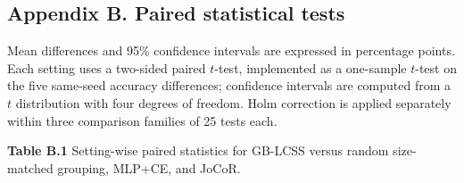\subsection{Appendix B. Paired statistical tests}\label{appendix-b.-paired-statistical-tests}

Mean differences and 95\% confidence intervals are expressed in percentage points. Each setting uses a two-sided paired \(t\)-test, implemented as a one-sample \(t\)-test on the five same-seed accuracy differences; confidence intervals are computed from a \(t\) distribution with four degrees of freedom. Holm correction is applied separately within three comparison families of 25 tests each.

\textbf{Table B.1} Setting-wise paired statistics for GB-LCSS versus random size-matched grouping, MLP+CE, and JoCoR.

